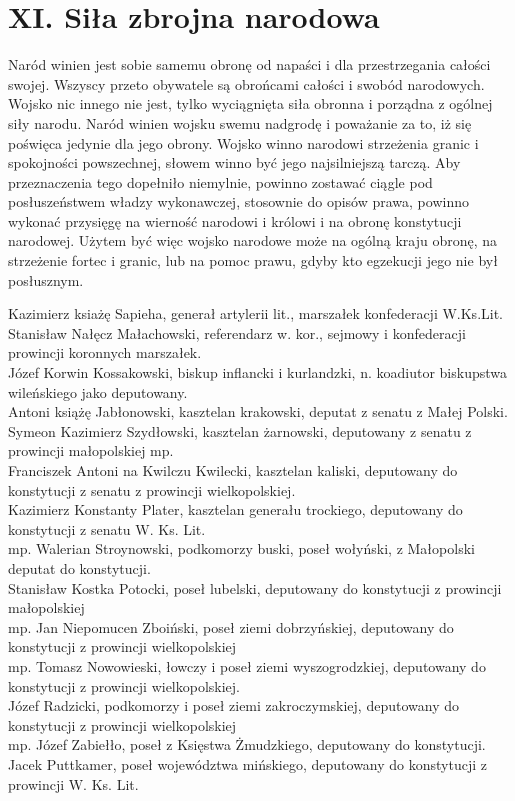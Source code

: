 \documentclass{book}
\begin{document}
\section*{XI. Siła zbrojna narodowa}

 Naród winien jest sobie samemu obronę od napaści i dla przestrzegania całości swojej.  Wszyscy przeto obywatele są  obrońcami całości i swobód narodowych.  Wojsko nic innego nie jest, tylko wyciągnięta siła obronna i porządna z ogólnej siły narodu.  Naród winien wojsku swemu nadgrodę i poważanie za to, iż się poświęca jedynie dla jego obrony.  Wojsko  winno narodowi strzeżenia granic i spokojności powszechnej, słowem winno być jego najsilniejszą tarczą.  Aby przeznaczenia tego dopełniło niemylnie, powinno zostawać ciągle pod posłuszeństwem władzy wykonawczej, stosownie do opisów prawa, powinno wykonać przysięgę na wierność narodowi i królowi i na obronę konstytucji narodowej.  Użytem być więc wojsko narodowe może na ogólną kraju obronę, na strzeżenie fortec i granic, lub na pomoc prawu, gdyby kto egzekucji jego nie był posłusznym. 

\newpage
{}
\begin{itshape}
\noindent Kazimierz ksiażę Sapieha, generał artylerii lit., marszałek konfederacji W.Ks.Lit. \\
Stanisław Nałęcz Małachowski, referendarz w. kor., sejmowy i konfederacji prowincji koronnych marszałek. \\
Józef Korwin Kossakowski, biskup inflancki i kurlandzki, n. koadiutor biskupstwa wileńskiego jako deputowany. \\
Antoni książę Jabłonowski, kasztelan krakowski, deputat z senatu z Małej Polski. \\
Symeon Kazimierz Szydłowski, kasztelan żarnowski, deputowany z senatu z prowincji małopolskiej mp. \\
Franciszek Antoni na Kwilczu   Kwilecki, kasztelan kaliski, deputowany do konstytucji z senatu z prowincji   wielkopolskiej. \\
Kazimierz Konstanty Plater, kasztelan generału trockiego,   deputowany do konstytucji z senatu W. Ks. Lit. \\
mp. Walerian Stroynowski, podkomorzy buski, poseł wołyński, z Małopolski deputat do konstytucji. \\
Stanisław   Kostka Potocki, poseł lubelski, deputowany do konstytucji z prowincji małopolskiej \\
mp.   Jan Niepomucen Zboiński, poseł ziemi dobrzyńskiej, deputowany do konstytucji    z prowincji wielkopolskiej \\
mp. Tomasz Nowowieski, łowczy i poseł ziemi    wyszogrodzkiej, deputowany do konstytucji z prowincji wielkopolskiej.    \\
Józef Radzicki, podkomorzy i poseł ziemi zakroczymskiej, deputowany do    konstytucji z prowincji wielkopolskiej \\
mp. Józef Zabiełło, poseł z Księstwa    Żmudzkiego, deputowany do konstytucji. \\
Jacek Puttkamer, poseł województwa    mińskiego, deputowany do konstytucji z prowincji W. Ks. Lit.     \\
\end{itshape}

 
\end{document}
